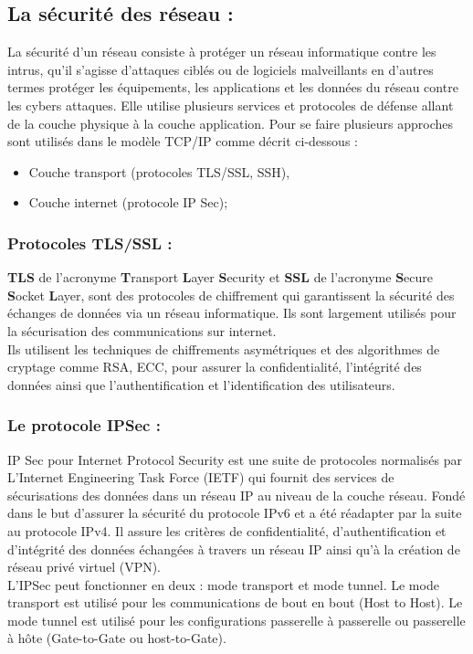 \subsection{La sécurité des réseau : }
La sécurité d’un réseau consiste à protéger un réseau informatique contre les intrus, qu'il s'agisse d'attaques ciblés ou de logiciels malveillants en d’autres termes protéger les équipements, les applications et les données du réseau contre les cybers attaques. Elle utilise plusieurs services et protocoles de défense allant de la couche physique à la couche application. Pour se faire plusieurs approches sont utilisés dans le modèle TCP/IP comme décrit ci-dessous :
\begin{itemize}[label=\textbullet]
\item Couche transport (protocoles TLS/SSL, SSH),
\item Couche internet (protocole IP Sec);
\end{itemize}
\subsubsection{Protocoles TLS/SSL :}
\textbf{TLS} de l’acronyme \textbf{T}ransport \textbf{L}ayer \textbf{S}ecurity et \textbf{SSL} de l’acronyme \textbf{S}ecure \textbf{S}ocket \textbf{L}ayer, sont des protocoles de chiffrement qui garantissent la sécurité des échanges de données via un réseau informatique. Ils sont largement utilisés pour la sécurisation des communications sur internet.\\
Ils utilisent les techniques de chiffrements asymétriques et des algorithmes de cryptage comme RSA, ECC, pour assurer la confidentialité, l’intégrité des données ainsi que l’authentification et l’identification des utilisateurs.
\subsubsection{Le protocole IPSec :}
IP Sec pour Internet Protocol Security est une suite de protocoles normalisés par L’Internet Engineering Task Force (IETF) qui fournit des services de sécurisations des données dans un réseau IP au niveau de la couche réseau. Fondé dans le but d’assurer la sécurité du protocole IPv6 et a été réadapter par la suite au protocole IPv4. Il assure les critères de confidentialité, d’authentification et d’intégrité des données échangées à travers un réseau IP ainsi qu’à la création de réseau privé virtuel (VPN).\\
L’IPSec peut fonctionner en deux : mode transport et mode tunnel. Le mode transport est utilisé pour les communications de bout en bout (Host to Host). Le mode tunnel est utilisé pour les configurations passerelle à passerelle ou passerelle à hôte (Gate-to-Gate ou host-to-Gate)\cite{ref9}.\\

